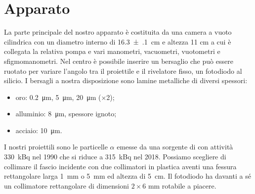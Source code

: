 \section{Apparato}

La parte principale del nostro apparato è costituita da una camera a vuoto cilindrica con un diametro interno di  \SI{16.3(1)}{cm} e altezza 11 cm a cui è collegata la relativa pompa e vari 
manometri, vacuometri, vuotometri e sfigmomanometri. 
Nel centro è possibile inserire un bersaglio che può essere ruotato per variare l'angolo tra il proiettile e il rivelatore fisso, un fotodiodo al silicio.
I bersagli a nostra disposizione sono lamine metalliche di diversi spessori: 
\begin{itemize}

\item oro: \SI{0.2}{\micro m}, \SI{5}{\micro m}, \SI{20}{\micro m} ($\times$2);
\item alluminio: \SI{8}{\micro m}, spessore ignoto;
\item acciaio: \SI{10}{\micro m}.

\end{itemize} 

I nostri proiettili sono le particelle $\alpha$ emesse da una sorgente di \am{} con attività \SI{330}{kBq} nel 1990 che si riduce a \SI{315}{kBq} nel 2018.
Possiamo scegliere di collimare il fascio incidente con due collimatori in plastica aventi una fessura rettangolare larga \SI{1}{mm} o \SI{5}{mm} ed altezza di \SI{5}{cm}.
Il fotodiodo ha davanti a sé un collimatore rettangolare di dimensioni $2\times 6$\! mm rotabile a piacere.

